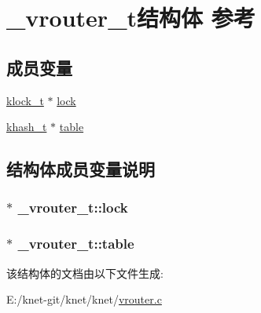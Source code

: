 \hypertarget{a00040}{}\section{\+\_\+vrouter\+\_\+t结构体 参考}
\label{a00040}
\subsection*{成员变量}
\begin{DoxyCompactItemize}
\item 
\hyperlink{a00056_a4c2f62ab63ab1fd49c71e52bbda0f393_a4c2f62ab63ab1fd49c71e52bbda0f393}{klock\+\_\+t} $\ast$ \hyperlink{a00040_a10ba7aef03e8ac7700961e9fc8a99523_a10ba7aef03e8ac7700961e9fc8a99523}{lock}
\item 
\hyperlink{a00056_aa242a9a673d8677076543d5768798f2c_aa242a9a673d8677076543d5768798f2c}{khash\+\_\+t} $\ast$ \hyperlink{a00040_a34f1df059625453cdc44c8df9b2eeeb6_a34f1df059625453cdc44c8df9b2eeeb6}{table}
\end{DoxyCompactItemize}


\subsection{结构体成员变量说明}
\hypertarget{a00040_a10ba7aef03e8ac7700961e9fc8a99523_a10ba7aef03e8ac7700961e9fc8a99523}{}
\subsubsection[{lock}]{$\ast$ \+\_\+vrouter\+\_\+t\+::lock}\label{a00040_a10ba7aef03e8ac7700961e9fc8a99523_a10ba7aef03e8ac7700961e9fc8a99523}
\hypertarget{a00040_a34f1df059625453cdc44c8df9b2eeeb6_a34f1df059625453cdc44c8df9b2eeeb6}{}
\subsubsection[{table}]{$\ast$ \+\_\+vrouter\+\_\+t\+::table}\label{a00040_a34f1df059625453cdc44c8df9b2eeeb6_a34f1df059625453cdc44c8df9b2eeeb6}


该结构体的文档由以下文件生成\+:\begin{DoxyCompactItemize}
\item 
E\+:/knet-\/git/knet/knet/\hyperlink{a00109}{vrouter.\+c}\end{DoxyCompactItemize}
